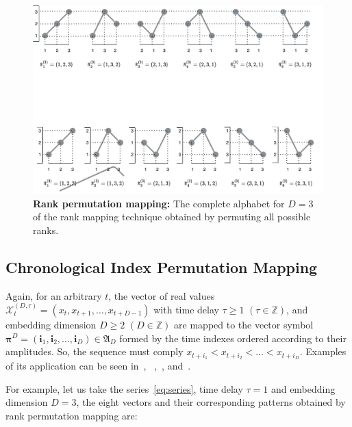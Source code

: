 \begin{figure}
    \centering
    \includegraphics[width=\linewidth]{Figures/rank.pdf}
    \caption{\textbf{Rank permutation mapping:} The complete alphabet for $D = 3$ of the rank mapping technique obtained by permuting all possible ranks.}
    \label{fig:Rank}
\end{figure}

\subsection{Chronological Index Permutation Mapping}\label{sub:chronological}

Again, for an arbitrary $t$, the vector of real values $\mathcal{X}^{(D, \tau)}_t = (x_t, x_{t + 1}, \dots, x_{t + D - 1})$ with time delay $\tau \geq 1$ $(\tau \in \mathbb{Z})$, and embedding dimension $D \geq 2$ $(D \in \mathbb{Z})$ are mapped to the vector symbol $\bm \pi^D = (\bm i_1, \bm i_2, \dots, \bm i_D) \in {\mathfrak A}_{D}$ formed by  the time indexes ordered according to their amplitudes. 
So, the sequence must comply $x_{t+i_1} < x_{t+i_2} < \dots < x_{t+i_D}$. 
Examples of its application can be seen in~\cite{Bandt2002Permutation}, ~\cite{DistinguishingNoiseFromChaos},~\cite{parlitz2012classifying}, and~\cite{bian2012modified}.

For example, let us take the series~\ref{eq:series}, time delay $\tau = 1$ and embedding dimension $D = 3$, the eight vectors and their corresponding patterns obtained by rank permutation mapping are:

